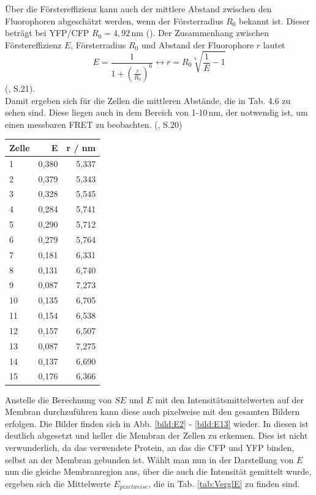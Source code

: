 Über die Förstereffizienz kann auch der mittlere Abstand zwischen den Fluorophoren abgeschätzt werden, wenn der Försterradius $R_0$ bekannt ist. 
Dieser beträgt bei YFP/CFP $R_0 = 4,92$\,nm (\cite{Patterson2000}). Der Zusammenhang zwischen Förstereffizienz $E$, Försterradius $R_0$ und Abstand der Fluorophore $r$ 
lautet 
\begin{equation*}
    E = \frac{1}{1+(\frac{r}{R_0})^6} \leftrightarrow r = R_0 \sqrt[6]{\frac{1}{E} -1} 
\end{equation*}
(\cite{Zuern2009}, S.21).\\
Damit ergeben sich für die Zellen die mittleren Abstände, die in Tab. 4.6 zu sehen sind. Diese liegen auch in dem Bereich von 
1-10\,nm, der notwendig ist, um einen messbaren FRET zu beobachten. (\cite{Zuern2009}, S.20)

\begin{center}
    \centering
    \begin{tabular}{lrr}
        \toprule
        Zelle &     E &     r / nm \\
        \midrule
        1     & 0,380 & 5,337 \\
        2     & 0,379 & 5,343 \\
        3     & 0,328 & 5,545 \\
        4     & 0,284 & 5,741 \\
        5     & 0,290 & 5,712 \\
        6     & 0,279 & 5,764 \\
        7     & 0,181 & 6,331 \\
        8     & 0,131 & 6,740 \\
        9     & 0,087 & 7,273 \\
        10    & 0,135 & 6,705 \\
        11    & 0,154 & 6,538 \\
        12    & 0,157 & 6,507 \\
        13    & 0,087 & 7,275 \\
        14    & 0,137 & 6,690 \\
        15    & 0,176 & 6,366 \\
        \bottomrule
    \end{tabular}
\end{center}



Anstelle die Berechnung von $SE$ und $E$ mit den Intensitätsmittelwerten auf der Membran durchzuführen kann diese auch pixelweise 
mit den gesamten Bildern erfolgen. Die Bilder finden sich in Abb. \ref{bild:E2} - \ref{bild:E13} wieder. In diesen ist deutlich abgesetzt 
und heller die Membran der Zellen zu erkennen. Dies ist nicht verwunderlich, da das verwendete Protein, an das die CFP und YFP binden, selbst 
an der Membran gebunden ist.
Wählt man nun in der Darstellung von $E$ nun die gleiche 
Membranregion aus, über die auch die Intensität gemittelt wurde, ergeben sich die Mittelwerte $E_{pixelweise}$, die in Tab. \ref{tab:VerglE} 
zu finden sind.


